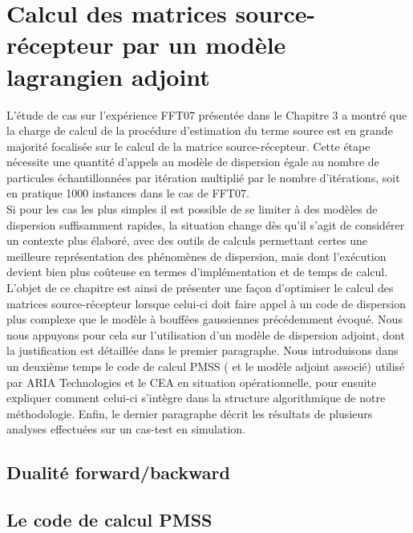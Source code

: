 \chapter{Calcul des matrices source-récepteur par un modèle lagrangien adjoint}

L'étude de cas sur l'expérience FFT07 présentée dans le Chapitre 3 a montré que la charge de calcul de la procédure d'estimation du terme source est en grande majorité focalisée sur le calcul de la matrice source-récepteur. Cette étape nécessite une quantité d'appels au modèle de dispersion égale au nombre de particules échantillonnées par itération multiplié par le nombre d'itérations, soit en pratique 1000 instances dans le cas de FFT07. \\
Si pour les cas les plus simples il est possible de se limiter à des modèles de dispersion suffisamment rapides, la situation change dès qu'il s'agit de considérer un contexte plus élaboré, avec des outils de calculs permettant certes une meilleure représentation des phénomènes de dispersion, mais dont l'exécution devient bien plus coûteuse en termes d'implémentation et de temps de calcul. \\
L'objet de ce chapitre est ainsi de présenter une façon d'optimiser le calcul des matrices source-récepteur lorsque celui-ci doit faire appel à un code de dispersion plus complexe que le modèle à bouffées gaussiennes précédemment évoqué. Nous nous appuyons pour cela sur l'utilisation d'un modèle de dispersion adjoint, dont la justification est détaillée dans le premier paragraphe. Nous introduisons dans un deuxième temps le code de calcul PMSS ( et le modèle adjoint associé) utilisé par ARIA Technologies et le CEA en situation opérationnelle, pour ensuite expliquer comment celui-ci s'intègre dans la structure algorithmique de notre méthodologie. Enfin, le dernier paragraphe décrit les résultats de plusieurs analyses effectuées sur un cas-test en simulation.

\section{Dualité forward/backward}

\section{Le code de calcul PMSS}

